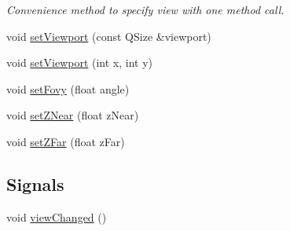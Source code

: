 \begin{DoxyCompactItemize}
\begin{DoxyCompactList}\small\item\em Convenience method to specify view with one method call. \end{DoxyCompactList}\item 
void \hyperlink{class_camera_ad47041196bf35fed448003491112f528}{set\+Viewport} (const Q\+Size \&viewport)
\item 
void \hyperlink{class_camera_ab0794a4ebc430368c5c3731e9bb35cdc}{set\+Viewport} (int x, int y)
\item 
void \hyperlink{class_camera_aa0e1d52fdb7e3d060041b960fa8b5c24}{set\+Fovy} (float angle)
\item 
void \hyperlink{class_camera_a4a8cda23fc022255f30452f608c66081}{set\+Z\+Near} (float z\+Near)
\item 
void \hyperlink{class_camera_a8ab94de2388acc72fa129fa203ccc587}{set\+Z\+Far} (float z\+Far)
\end{DoxyCompactItemize}
\subsection*{Signals}
\begin{DoxyCompactItemize}
\item 
void \hyperlink{class_camera_af652ce7cb83eb966a90393be8e0038c3}{view\+Changed} ()
\end{DoxyCompactItemize}
